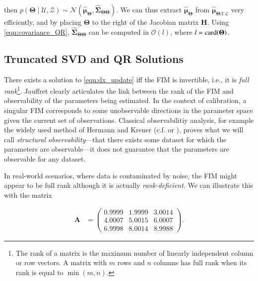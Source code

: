 \noindent then $p(\boldsymbol{\Theta}\mid\mathcal{U},\mathcal{Z})\sim\mathcal{N}
(\hat{\boldsymbol{\mu}}_{\boldsymbol{\Theta}},
\hat{\boldsymbol{\Sigma}}_{\boldsymbol{\Theta}\boldsymbol{\Theta}})$. We can
thus extract $\hat{\boldsymbol{\mu}}_{\boldsymbol{\Theta}}$ from
$\hat{\boldsymbol{\mu}}_{\boldsymbol{\Theta}\mathcal{X}\mathcal{L}}$ very
efficiently, and by placing $\boldsymbol{\Theta}$ to the right of the Jacobian
matrix $\mathbf{H}$. Using \eqref{eqn:covariance_QR},
$\hat{\boldsymbol{\Sigma}}_{\boldsymbol{\Theta}\boldsymbol{\Theta}}$ can be
computed in $\mathcal{O}(l)$, where $l=\operatorname{card}(\boldsymbol{\Theta})$.

\subsection{Truncated SVD and QR Solutions}\label{sec:tsvd}

There exists a solution to \eqref{eqn:dx_update} iff the FIM is
invertible, i.e., it is \emph{full rank}\footnote{The rank of a matrix is the
maximum number of linearly independent column or row vectors. A matrix
with $m$ rows and $n$ columns has full rank when its rank is equal to
$\min(m,n)$.}.
Jauffret \cite{jauffret07observability} clearly articulates the link
between the rank of the FIM and observability of the parameters being
estimated. In the context of calibration, a singular FIM corresponds
to some unobservable directions in the parameter space given the
current set of observations. Classical observabilitiy analysis, for
example the widely used method of Hermann and Krener
\cite{hermann77nonlinear} (c.f. \cite{kelly11visual} or
\cite{mirzaei08kalman}), proves what we will call {\em structural
observability}---that there exists
some dataset for which the parameters are observable---it does not
guarantee that the parameters are observable for any dataset.

In real-world scenarios, where data is contaminated by noise, the
FIM might appear to be full rank although it is actually
\emph{rank-deficient}. We can illustrate this with the matrix

\begin{equation}\label{eqn:rank_deficient_matrix}
  \begin{aligned}
    \mathbf{A} &=
    \begin{pmatrix}
    0.9999&1.9999&3.0014\\
    4.0007&5.0015&6.0007\\
    6.9998&8.0014&8.9988
    \end{pmatrix}.
  \end{aligned}
\end{equation}

